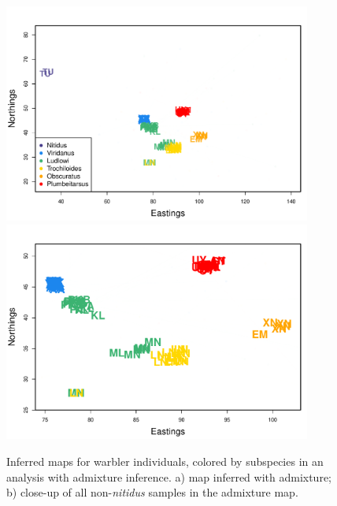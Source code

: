 \documentclass[10pt,letterpaper]{article}
\begin{document}
\begin{figure}
	\centering
			{\includegraphics[width=0.9\textwidth,height=0.75\textwidth]{../figs/warblers/individual_warbler_map_arrows_randpr2.pdf}}
			{\includegraphics[width=0.9\textwidth,height=0.75\textwidth]{../figs/warblers/individual_warbler_map_arrows_randpr2_closeup.pdf}}
	\caption{
    Inferred maps for warbler individuals, colored by subspecies in an analysis with admixture inference. 
    a) map inferred with admixture; b) close-up of all non-\textit{nitidus} samples in the admixture map.
}\label{sfig:warbler_ind_maps}
\end{figure}
\end{document}
